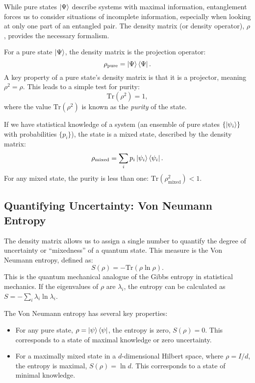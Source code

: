 While pure states $\ket{\Psi}$ describe systems with maximal information,
entanglement forces us to consider situations of incomplete information,
especially when looking at only one part of an entangled pair. The
density matrix (or density operator), $\rho$, provides the necessary
formalism.

For a pure state $\ket{\Psi}$, the density matrix is the projection operator:
\begin{equation}
	\rho_{\text{pure}} = \ket{\Psi}\bra{\Psi}.
\end{equation}
A key property of a pure state's density matrix is that it is a projector,
meaning $\rho^2 = \rho$. This leads to a simple test for purity:
\begin{equation}
	\mathrm{Tr}(\rho^2) = 1,
\end{equation}
where the value $\mathrm{Tr}(\rho^2)$ is known as the \textit{purity} of the
state.

If we have statistical knowledge of a system (an ensemble of pure states
$\{\ket{\psi_i}\}$ with probabilities $\{p_i\}$), the state is a
mixed state, described by the density matrix:
\begin{equation}
	\rho_{\text{mixed}} = \sum_i p_i \ket{\psi_i}\bra{\psi_i}.
\end{equation}
For any mixed state, the purity is less than one:
$\mathrm{Tr}(\rho_{\text{mixed}}^2) < 1$.

\subsection{Quantifying Uncertainty: Von Neumann Entropy}
\label{sub:von_neumann_entropy}

The density matrix allows us to assign a single number to quantify the
degree of uncertainty or ``mixedness'' of a quantum state. This measure is the
Von Neumann entropy, defined as:
\begin{equation}
	S(\rho) = - \mathrm{Tr}(\rho \ln \rho).
\end{equation}
This is the quantum mechanical analogue of the Gibbs entropy in statistical
mechanics. If the eigenvalues of $\rho$ are $\lambda_i$, the entropy can be
calculated as $S = - \sum_i \lambda_i \ln \lambda_i$.

The Von Neumann entropy has several key properties:
\begin{itemize}
	\item For any pure state, $\rho = \ket{\psi}\bra{\psi}$, the
		entropy is zero, $S(\rho) = 0$. This corresponds to a state of
		maximal knowledge or zero uncertainty.
	\item For a maximally mixed state in a $d$-dimensional Hilbert
		space, where $\rho = I/d$, the entropy is maximal,
		$S(\rho) = \ln d$. This corresponds to a state of minimal knowledge.
\end{itemize}


